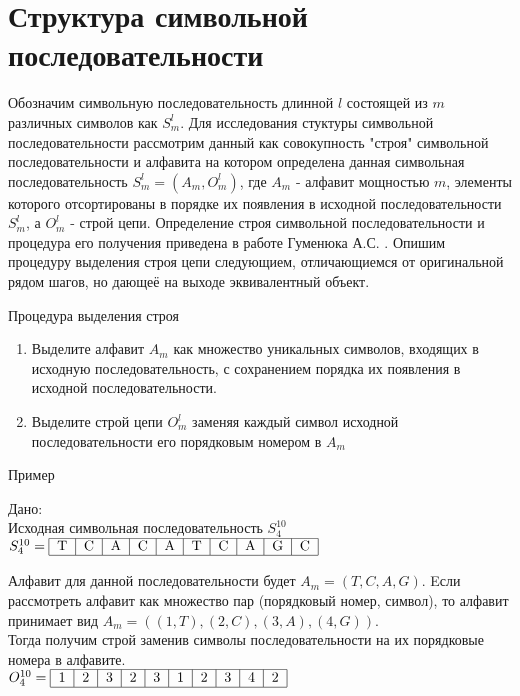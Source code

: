 \part{Структура символьной последовательности}

Обозначим символьную последовательность длинной $l$ состоящей из $m$ различных символов как $S^{l}_{m}$.
Для исследования стуктуры символьной последовательности рассмотрим данный как совокупность "строя" символьной последовательности
и алфавита на котором определена данная символьная последовательность $S^{l}_{m}=(A_{m}, O^{l}_{m})$, 
где $A_{m}$ - алфавит мощностью $m$, элементы которого отсортированы в порядке их появления в исходной последовательности $S^{l}_{m}$, 
а $O^{l}_{m}$ - строй цепи.
Определение строя символьной последовательности и процедура его получения  приведена в работе Гуменюка А.С. \cite{gumenuk_base}.
Опишим процедуру выделения строя цепи следующием, отличающиемся от оригинальной рядом шагов, но дающеё на выходе эквивалентный объект.

\subparagraph{Процедура выделения строя}

\begin{enumerate}
 \item Выделите алфавит $A_{m}$ как множество уникальных символов, входящих в исходную последовательность, 
       с сохранением порядка их появления  в исходной последовательности.
 \item Выделите строй цепи $O^{l}_{m}$ заменяя каждый символ исходной последовательности его порядковым номером в $A_{m}$
\end{enumerate}

\subparagraph{Пример}

Дано:\\
  Исходная символьная последовательность $S^{10}_{4}$\\ 
  $S^{10}_{4} = \begin{tabular}{|c|c|c|c|c|c|c|c|c|c|}
  \hline
  T & C & A & C & A & T & C & A & G & C \\
  \hline
  \end{tabular}$
 
 Алфавит для данной последовательности будет $A_{m} = (T, C, A, G)$.
 Eсли рассмотреть алфавит как множество пар (порядковый номер, символ), то алфавит принимает вид $A_{m} = ((1, T), (2, C), (3, A), (4, G))$.\\
 Тогда получим строй заменив символы последовательности на их порядковые номера в алфавите. \\
  $O^{10}_{4} = \begin{tabular}{|c|c|c|c|c|c|c|c|c|c|}
  \hline
  1 & 2 & 3 & 2 & 3 & 1 & 2 & 3 & 4 & 2 \\
  \hline
  \end{tabular}$
 


